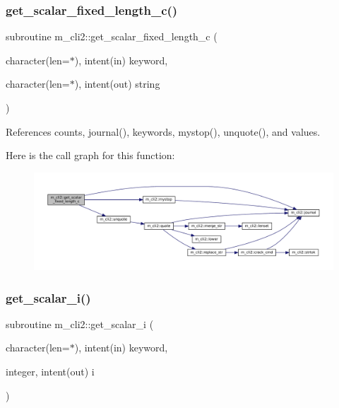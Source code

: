 \subsubsection{\texorpdfstring{get\+\_\+scalar\+\_\+fixed\+\_\+length\+\_\+c()}{get\_scalar\_fixed\_length\_c()}}
{\footnotesize\ttfamily subroutine m\+\_\+cli2\+::get\+\_\+scalar\+\_\+fixed\+\_\+length\+\_\+c (\begin{DoxyParamCaption}\item[{character(len=$\ast$), intent(in)}]{keyword,  }\item[{character(len=$\ast$), intent(out)}]{string }\end{DoxyParamCaption})\hspace{0.3cm}{\ttfamily [private]}}



References counts, journal(), keywords, mystop(), unquote(), and values.

Here is the call graph for this function\+:
\nopagebreak
\begin{figure}[H]
\begin{center}
\leavevmode
\includegraphics[width=350pt]{namespacem__cli2_a9dcc99d34db1771959a1461274ae073e_cgraph}
\end{center}
\end{figure}
\mbox{\label{namespacem__cli2_a9c5208ef6763da7e68dd1e118bea0b7a}} 
\subsubsection{\texorpdfstring{get\+\_\+scalar\+\_\+i()}{get\_scalar\_i()}}
{\footnotesize\ttfamily subroutine m\+\_\+cli2\+::get\+\_\+scalar\+\_\+i (\begin{DoxyParamCaption}\item[{character(len=$\ast$), intent(in)}]{keyword,  }\item[{integer, intent(out)}]{i }\end{DoxyParamCaption})\hspace{0.3cm}{\ttfamily [private]}}



